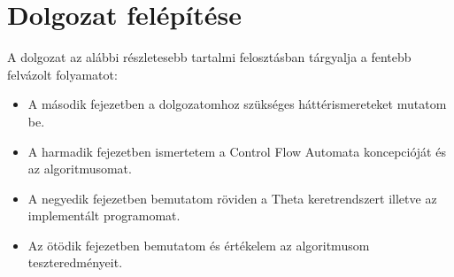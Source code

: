 \section{Dolgozat felépítése}

A dolgozat az alábbi részletesebb tartalmi felosztásban tárgyalja a fentebb felvázolt folyamatot:
\begin{itemize}
	\item A második fejezetben a dolgozatomhoz szükséges háttérismereteket mutatom be.
	\item A harmadik fejezetben ismertetem a Control Flow Automata koncepcióját és az algoritmusomat.
	\item A negyedik fejezetben bemutatom röviden a Theta keretrendszert illetve az implementált programomat.
	\item Az ötödik fejezetben bemutatom és értékelem az algoritmusom teszteredményeit.
\end{itemize}